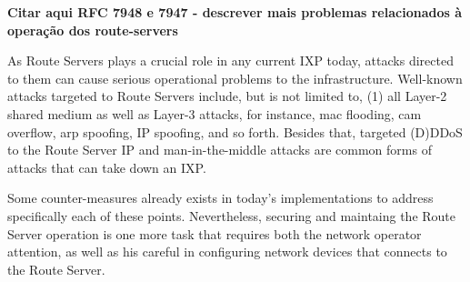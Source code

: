 \documentclass[12pt]{article}
\begin{document}

\textbf{Citar aqui RFC 7948 e 7947 - descrever mais problemas relacionados à operação dos route-servers}


As Route Servers plays a crucial role in any current IXP today, attacks directed to them can cause serious operational problems to the infrastructure. Well-known attacks targeted to Route Servers include, but is not limited to, (1) all Layer-2 shared medium as well as Layer-3 attacks, for instance, mac flooding, cam overflow, arp spoofing, IP spoofing, and so forth. Besides that, targeted (D)DDoS to the Route Server IP and man-in-the-middle attacks are common forms of attacks that can take down an IXP.


Some counter-measures already exists in today's implementations to address specifically each of these points. Nevertheless, securing and maintaing the Route Server operation is one more task that requires both the network operator attention, as well as his careful in configuring network devices that connects to the Route Server.
\end{document}
